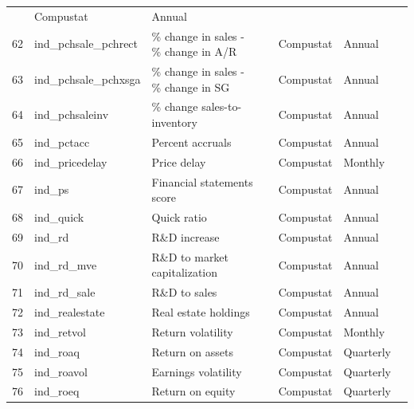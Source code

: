 \documentclass[a4paper, table]{article}
\begin{document}
\begin{landscape}
\begin{center}
\begin{longtable}{lllllll}
				\cite{abarbanell_abnormal_1998} & Compustat & Annual \\
			62 & ind\_pchsale\_pchrect\footnotemark[\value{footnote}] & \% change in sales - \% change in A/R & 
				\cite{abarbanell_abnormal_1998} & Compustat & Annual \\
			63 & ind\_pchsale\_pchxsga\footnotemark[\value{footnote}] & \% change in sales - \% change in SG & 
				\cite{abarbanell_abnormal_1998} & Compustat & Annual \\
			64 & ind\_pchsaleinv\footnotemark[\value{footnote}] & \% change sales-to-inventory & 
				\cite{ou_financial_1989} & Compustat & Annual \\
			65 & ind\_pctacc\footnotemark[\value{footnote}] & Percent accruals & 
				\cite{hafzalla_percent_2011} & Compustat & Annual \\
			66 & ind\_pricedelay & Price delay & 
				\cite{hou_market_2005} & Compustat & Monthly \\
			67 & ind\_ps & Financial statements score & 
				\cite{piotroski_value_2000} & Compustat & Annual \\
			68 & ind\_quick & Quick ratio & 
				\cite{ou_financial_1989} & Compustat & Annual \\
			69 & ind\_rd & R\&D increase & 
				\cite{eberhart_examination_2004} & Compustat & Annual \\
			70 & ind\_rd\_mve\footnotemark[\value{footnote}] & R\&D to market capitalization & 
				\cite{guo_explaining_2006} & Compustat & Annual \\
			71 & ind\_rd\_sale\footnotemark[\value{footnote}] & R\&D to sales & 
				\cite{guo_explaining_2006} & Compustat & Annual \\
			72 & ind\_realestate\footnotemark[\value{footnote}] & Real estate holdings & 
				\cite{tuzel_corporate_2010} & Compustat & Annual \\
			73 & ind\_retvol & Return volatility & 
				\cite{ang_cross-section_2006} & Compustat & Monthly \\
			74 & ind\_roaq & Return on assets & 
				\cite{balakrishnan_post_2010} & Compustat & Quarterly \\
			75 & ind\_roavol\footnotemark[\value{footnote}] & Earnings volatility & 
				\cite{francis_costs_2004} & Compustat & Quarterly \\
			76 & ind\_roeq & Return on equity & 
				\cite{hou_digesting_2015} & Compustat & Quarterly \\

\end{longtable}
\end{center}
\end{landscape}
\end{document}
